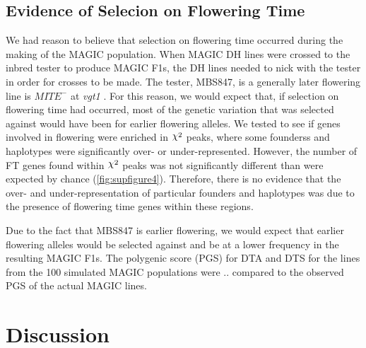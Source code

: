 \documentclass[article,9pt,twocolumn,twoside]{rilabRxiv}
\DeclareRobustCommand{\rchi}{{\mathpalette\irchi\relax}}
\newcommand{\irchi}[2]{\raisebox{\depth}{$#1\chi$}} %
\begin{document}
\subsection{Evidence of Selecion on Flowering Time}
We had reason to believe that selection on flowering time occurred during the making of the MAGIC population.
When MAGIC DH lines were crossed to the inbred tester to produce MAGIC F1s, the DH lines needed to nick with the tester in order for crosses to be made.
The tester, MBS847, is a generally later flowering line is $MITE^-$ at \emph{vgt1} \cite{Chardon}.
For this reason, we would expect that, if selection on flowering time had occurred, most of the genetic variation that was selected against would have been for earlier flowering alleles.
We tested to see if genes involved in flowering were enriched in $\rchi^2$ peaks, where some founderss and haplotypes were significantly over- or under-represented.
However, the number of FT genes found within $\rchi^2$ peaks was not significantly different than were expected by chance (\ref{fig:supfigure4}).
Therefore, there is no evidence that the over- and under-representation of particular founders and haplotypes was due to the presence of flowering time genes within these regions.

Due to the fact that MBS847 is earlier flowering, we would expect that earlier flowering alleles would be selected against and be at a lower frequency in the resulting MAGIC F1s.
The polygenic score (PGS) for DTA and DTS for the lines from the 100 simulated MAGIC populations were .. compared to the observed PGS of the actual MAGIC lines.


\section{Discussion}
\end{document}
